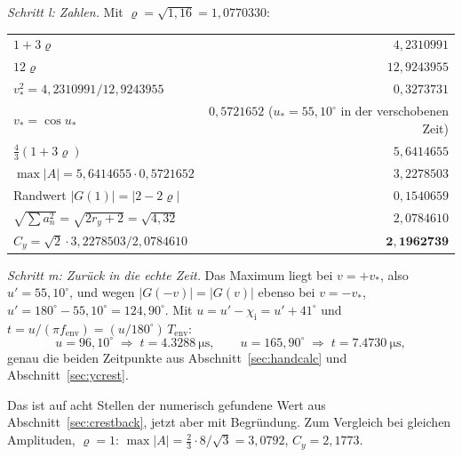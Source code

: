 \documentclass[11pt,a4paper]{article}
\newcommand{\crest}{\ensuremath{C}}
\begin{document}
\smallskip
\noindent\textit{Schritt l: Zahlen.} Mit $\varrho=\sqrt{1{,}16}=1{,}0770330$:
\begin{center}
\begin{tabular}{@{}lr@{}}
  \toprule
  $1+3\varrho$ & $4{,}2310991$\\
  $12\varrho$ & $12{,}9243955$\\
  $v_*^2 = 4{,}2310991/12{,}9243955$ & $0{,}3273731$\\
  $v_* = \cos u_*$ & $0{,}5721652$ \quad($u_*=55{,}10^\circ$ in der verschobenen Zeit)\\
  $\tfrac43(1+3\varrho)$ & $5{,}6414655$\\
  $\max|A| = 5{,}6414655\cdot0{,}5721652$ & $3{,}2278503$\\
  Randwert $|G(1)| = |2-2\varrho|$ & $0{,}1540659$\\
  $\sqrt{\sum a_n^2} = \sqrt{2r_y+2} = \sqrt{4{,}32}$ & $2{,}0784610$\\
  $\crest_y = \sqrt2\cdot3{,}2278503/2{,}0784610$ & $\mathbf{2{,}1962739}$\\
  \bottomrule
\end{tabular}
\end{center}

\smallskip
\noindent\textit{Schritt m: Zurück in die echte Zeit.}
Das Maximum liegt bei $v=+v_*$, also $u'=55{,}10^\circ$, und wegen
$|G(-v)|=|G(v)|$ ebenso bei $v=-v_*$, $u'=180^\circ-55{,}10^\circ=124{,}90^\circ$.
Mit $u = u'-\chi_\mathrm{i} = u'+41^\circ$ und $t = u/(\pi f_\mathrm{env}) = (u/180^\circ)\,T_\mathrm{env}$:
\begin{equation}
  u = 96{,}10^\circ \;\Rightarrow\; t = \SI{4.3288}{\micro\second},
  \qquad
  u = 165{,}90^\circ \;\Rightarrow\; t = \SI{7.4730}{\micro\second},
\end{equation}
genau die beiden Zeitpunkte aus Abschnitt~\ref{sec:handcalc} und
Abschnitt~\ref{sec:ycrest}.

Das ist auf acht Stellen der numerisch gefundene Wert aus
Abschnitt~\ref{sec:crestback}, jetzt aber mit Begründung. Zum Vergleich bei
gleichen Amplituden, $\varrho=1$: $\max|A| = \tfrac23\cdot8/\sqrt3 = 3{,}0792$,
$\crest_y = 2{,}1773$.
\end{document}
